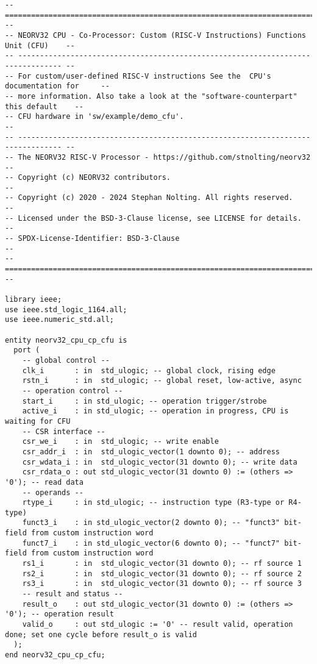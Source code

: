 \begin{code}
\begin{verbatim}
-- ================================================================================ --
-- NEORV32 CPU - Co-Processor: Custom (RISC-V Instructions) Functions Unit (CFU)    --
-- -------------------------------------------------------------------------------- --
-- For custom/user-defined RISC-V instructions See the  CPU's documentation for     --
-- more information. Also take a look at the "software-counterpart" this default    --
-- CFU hardware in 'sw/example/demo_cfu'.                                           --
-- -------------------------------------------------------------------------------- --
-- The NEORV32 RISC-V Processor - https://github.com/stnolting/neorv32              --
-- Copyright (c) NEORV32 contributors.                                              --
-- Copyright (c) 2020 - 2024 Stephan Nolting. All rights reserved.                  --
-- Licensed under the BSD-3-Clause license, see LICENSE for details.                --
-- SPDX-License-Identifier: BSD-3-Clause                                            --
-- ================================================================================ --

library ieee;
use ieee.std_logic_1164.all;
use ieee.numeric_std.all;

entity neorv32_cpu_cp_cfu is
  port (
    -- global control --
    clk_i       : in  std_ulogic; -- global clock, rising edge
    rstn_i      : in  std_ulogic; -- global reset, low-active, async
    -- operation control --
    start_i     : in std_ulogic; -- operation trigger/strobe
    active_i    : in std_ulogic; -- operation in progress, CPU is waiting for CFU
    -- CSR interface --
    csr_we_i    : in  std_ulogic; -- write enable
    csr_addr_i  : in  std_ulogic_vector(1 downto 0); -- address
    csr_wdata_i : in  std_ulogic_vector(31 downto 0); -- write data
    csr_rdata_o : out std_ulogic_vector(31 downto 0) := (others => '0'); -- read data
    -- operands --
    rtype_i     : in std_ulogic; -- instruction type (R3-type or R4-type)
    funct3_i    : in std_ulogic_vector(2 downto 0); -- "funct3" bit-field from custom instruction word
    funct7_i    : in std_ulogic_vector(6 downto 0); -- "funct7" bit-field from custom instruction word
    rs1_i       : in  std_ulogic_vector(31 downto 0); -- rf source 1
    rs2_i       : in  std_ulogic_vector(31 downto 0); -- rf source 2
    rs3_i       : in  std_ulogic_vector(31 downto 0); -- rf source 3
    -- result and status --
    result_o    : out std_ulogic_vector(31 downto 0) := (others => '0'); -- operation result
    valid_o     : out std_ulogic := '0' -- result valid, operation done; set one cycle before result_o is valid
  );
end neorv32_cpu_cp_cfu;


\end{verbatim}
\end{code}
